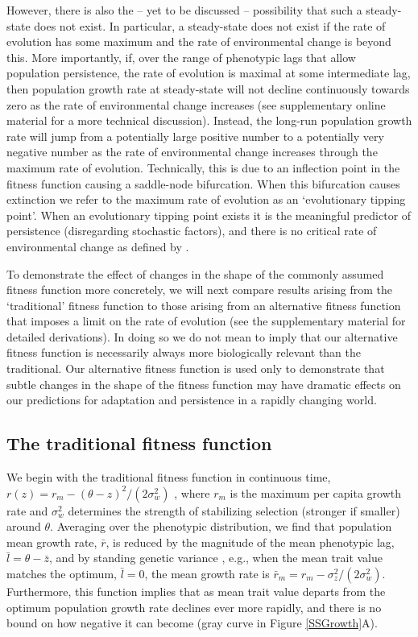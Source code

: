 \documentclass[12pt,letterpaper]{article} %
\begin{document}
However, there is also the -- yet to be discussed -- possibility that such a steady-state does not exist.
In particular, a steady-state does not exist if the rate of evolution has some maximum and the rate of environmental change is beyond this.
More importantly, if, over the range of phenotypic lags that allow population persistence, 
the rate of evolution is maximal at some intermediate lag, 
then population growth rate at steady-state will not decline continuously towards zero as the rate of environmental change increases (see supplementary online material for a more technical discussion).
Instead, the long-run population growth rate will jump from a potentially large positive number to a potentially very negative number as the rate of environmental change increases through the maximum rate of evolution.
Technically, this is due to an inflection point in the fitness function causing a saddle-node bifurcation.
When this bifurcation causes extinction we refer to the maximum rate of evolution as an `evolutionary tipping point'. 
When an evolutionary tipping point exists it is the meaningful predictor of persistence (disregarding stochastic factors), and there is no critical rate of environmental change as defined by \cite{Lynch1993}.

To demonstrate the effect of changes in the shape of the commonly assumed fitness function more concretely, we will next compare results arising from the `traditional' fitness function to those arising from an alternative fitness function that imposes a limit on the rate of evolution (see the supplementary material for detailed derivations).
In doing so we do not mean to imply that our alternative fitness function is necessarily always more biologically relevant than the traditional.
Our alternative fitness function is used only to demonstrate that subtle changes in the shape of the fitness function may have dramatic effects on our predictions for adaptation and persistence in a rapidly changing world.

\subsection*{The traditional fitness function}

We begin with the traditional fitness function in continuous time,  $r(z) = r_m - (\theta - z)^2 / (2\sigma_w^2)$ \citep[][equation 1]{Lynch1993}, where $r_m$ is the maximum per capita growth rate and $\sigma_w^2$ determines the strength of stabilizing selection (stronger if smaller) around $\theta$.
Averaging over the phenotypic distribution, we find that population mean growth rate, $\bar{r}$, is reduced by the magnitude of the mean phenotypic lag, $\bar{l} = \theta - \bar{z} $, and by standing genetic variance \citep{Lande1996}, e.g., when the mean trait value matches the optimum, $\bar{l}=0$, the mean growth rate is $\bar{r}_m = r_m - \sigma_z^2/(2\sigma_w^2)$.
Furthermore, this function implies that as mean trait value departs from the optimum population growth rate declines ever more rapidly, and there is no bound on how negative it can become (gray curve in Figure \ref{SSGrowth}A).
\end{document}
